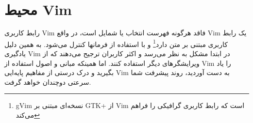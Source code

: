 \section{محیط Vim}
رابط کاربری Vim فاقد هرگونه فهرست انتخاب یا شمایل است، در واقع Vim یک رابط کاربری مبتنی بر متن دارد\footnote{gVim نسخه‌ای مبتنی بر GTK+ از Vim است که رابط کاربری گرافیکی را فراهم می‌کند} و با استفاده از فرمانها کنترل می‌شود. به همین دلیل یادگیری Vim در ابتدا مشکل به نظر می‌رسد و اکثر کاربران ترجیح می‌دهند که از ویرایشگرهای دیگر استفاده کنند. اما همینکه مبانی و اصول استفاده از Vim را یاد بگیرید و درک درستی از مفاهیم پا‌یه‌ایی Vim به دست آوردید، روند پیشرفت شما سرعتی دوچندان خواهد گرفت.

